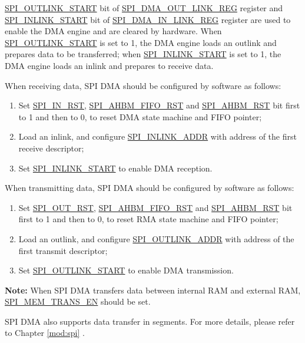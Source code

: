 \documentclass[main\_\_EN.tex]{subfiles}
\begin{document}
\hyperref[fielddesc:SPIOUTLINKSTART]{SPI\_OUTLINK\_START} bit of \hyperref[regdesc:SPIDMAOUTLINKREG]{SPI\_DMA\_OUT\_LINK\_REG} register and \hyperref[fielddesc:SPIINLINKSTART]{SPI\_INLINK\_START} bit of \hyperref[regdesc:SPIDMAINLINKREG]{SPI\_DMA\_IN\_LINK\_REG} register are used to enable the DMA engine and are cleared by hardware. When \hyperref[fielddesc:SPIOUTLINKSTART]{SPI\_OUTLINK\_START} is set to 1, the DMA engine loads an outlink and prepares data to be transferred; when \hyperref[fielddesc:SPIINLINKSTART]{SPI\_INLINK\_START} is set to 1, the DMA engine loads an inlink and prepares to receive data.

When receiving data, SPI DMA should be configured by software as follows:
\begin{enumerate}
    \item Set \hyperref[fielddesc:SPIINRST]{SPI\_IN\_RST}, \hyperref[fielddesc:SPIAHBMFIFORST]{SPI\_AHBM\_FIFO\_RST} and \hyperref[fielddesc:SPIAHBMRST]{SPI\_AHBM\_RST} bit first to 1 and then to 0, to reset DMA state machine and FIFO pointer;
    \item Load an inlink, and configure \hyperref[fielddesc:SPIINLINKADDR]{SPI\_INLINK\_ADDR} with address of the first receive descriptor;
    \item Set \hyperref[fielddesc:SPIINLINKSTART]{SPI\_INLINK\_START} to enable DMA reception.\\
\end{enumerate}

When transmitting data, SPI DMA should be configured by software as follows:
\begin{enumerate}
   \item Set \hyperref[fielddesc:SPIOUTRST]{SPI\_OUT\_RST}, \hyperref[fielddesc:SPIAHBMFIFORST]{SPI\_AHBM\_FIFO\_RST} and \hyperref[fielddesc:SPIAHBMRST]{SPI\_AHBM\_RST} bit first to 1 and then to 0, to reset RMA state machine and FIFO pointer;
   \item Load an outlink, and configure \hyperref[fielddesc:SPIOUTLINKADDR]{SPI\_OUTLINK\_ADDR} with address of the first transmit descriptor;
   \item Set \hyperref[fielddesc:SPIOUTLINKSTART]{SPI\_OUTLINK\_START} to enable DMA transmission.
\end{enumerate}

{\bfseries Note:} When SPI DMA transfers data between internal RAM and external RAM, \hyperref[fielddesc:SPIMEMTRANSEN]{SPI\_MEM\_TRANS\_EN} should be set.


SPI DMA also supports data transfer in segments. For more details, please refer to Chapter \ref{mod:spi} \textit{}.
\end{document}
